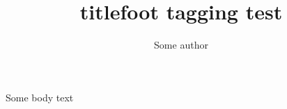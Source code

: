 \documentclass{article}
\title{titlefoot tagging test}
\author{Some author}
\begin{document}
\maketitle

Some body text
\end{document}
